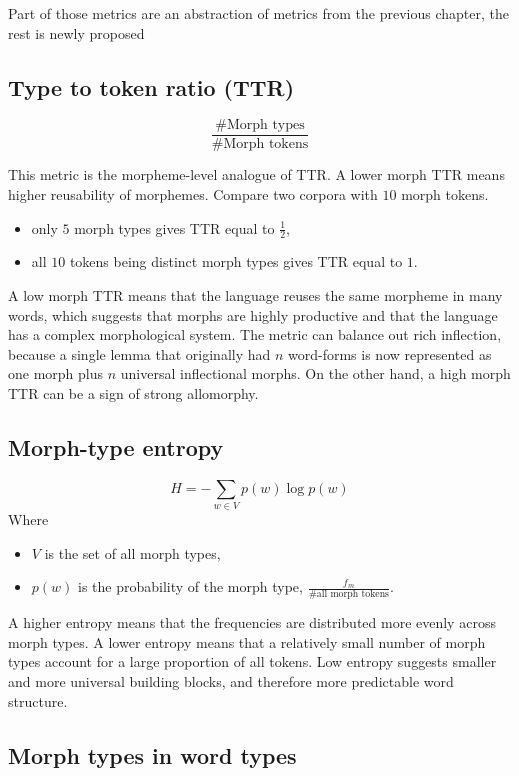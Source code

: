 Part of those metrics are an abstraction of metrics from the previous chapter, the rest is newly proposed

\subsection{Type to token ratio (TTR)}
$$
\frac{\text{\# Morph types}}{\text{\# Morph tokens}}
$$

This metric is the morpheme-level analogue of TTR. A lower morph TTR means higher reusability of morphemes. Compare two corpora with $10$ morph tokens.
\begin{itemize}
    \item only $5$ morph types gives TTR equal to $\frac{1}{2}$,
    \item all $10$ tokens being distinct morph types gives TTR equal to $1$.
\end{itemize}
A low morph TTR means that the language reuses the same morpheme in many words, which suggests that morphs are highly productive and that the language has a complex morphological system. The metric can balance out rich inflection, because a single lemma that originally had $n$ word-forms is now represented as one morph plus $n$ universal inflectional morphs. On the other hand, a high morph TTR can be a sign of strong allomorphy.

\subsection{Morph-type entropy}
$$
H=-\sum_{w \in V} p(w)\log p(w)
$$
Where
\begin{itemize}
    \item $V$ is the set of all morph types,
    \item $p(w)$ is the probability of the morph type, $\frac{ f_m } {\text{\# all morph tokens}}$.
\end{itemize}

A higher entropy means that the frequencies are distributed more evenly across morph types. A lower entropy means that a relatively small number of morph types account for a large proportion of all tokens. Low entropy suggests smaller and more universal building blocks, and therefore more predictable word structure.

\subsection{Morph types in word types}

